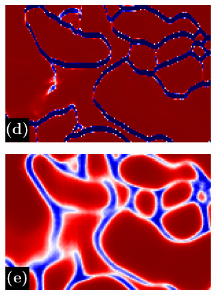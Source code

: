 \begin{figure}[t]
\begin{subfigure}[t]{0.16\linewidth}
\end{subfigure}
\begin{subfigure}[t]{0.16\linewidth}
\centering
\includegraphics[width=0.99\linewidth,trim=0in 0in 0in 0.2in,clip]{./figures/LSIMasks/aff_compare_designer/dice_1.pdf} %
\end{subfigure}
\begin{subfigure}[t]{0.16\linewidth}
\centering
\includegraphics[width=0.99\linewidth,trim=0in 0in 0in 0.2in,clip]{./figures/LSIMasks/aff_compare_designer/mask_2.pdf} %
\end{subfigure}
\begin{subfigure}[t]{0.16\linewidth}
\centering

\end{subfigure}
\end{figure}

